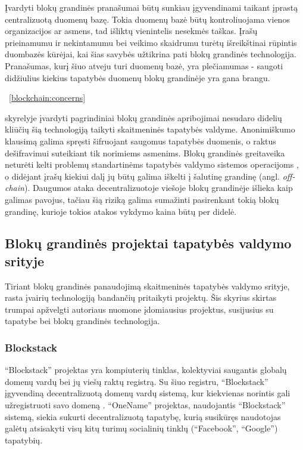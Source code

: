 Įvardyti blokų grandinės pranašumai būtų sunkiau įgyvendinami taikant įprastą centralizuotą duomenų bazę. Tokia duomenų bazė
būtų kontroliuojama vienos organizacijos ar asmens, tad išliktų vienintelis nesekmės taškas. Įrašų prieinamumu ir nekintamumu bei veikimo
skaidrumu
turėtų išreikštinai rūpintis duombazės kūrėjai, kai šias savybės užtikrina pati blokų grandinės technologija. Pranašumas, kurį
šiuo atveju turi duomenų bazė, yra plečiamumas - saugoti didžiulius kiekius tapatybės duomenų blokų grandinėje yra gana brangu.

\hypertarget{blockchain:concerns}{~\ref{blockchain:concerns}} skyrelyje įvardyti pagrindiniai blokų grandinės apribojimai nesudaro didelių kliūčių šią technologiją taikyti skaitmeninės tapatybės valdyme.
Anonimiškumo klausimą galima spręsti šifruojant saugomus tapatybės duomenis,
o raktus dešifravimui suteikiant tik norimiems asmenims. Blokų grandinės greitaveika neturėti kelti problemų
standartinėms tapatybės valdymo sistemos operacijoms \cite{Lo2017}, o didėjant įrašų kiekiui dalį jų būtų galima iškelti į
šalutinę grandinę (angl. \textit{off-chain}). Daugumos ataka decentralizuotoje viešoje blokų grandinėje išlieka kaip galimas pavojus,
tačiau šią riziką galima sumažinti pasirenkant tokią blokų grandinę, kurioje tokios atakos vykdymo kaina būtų per didelė.

\subsection{Blokų grandinės projektai tapatybės valdymo srityje}

Tiriant blokų grandinės panaudojimą skaitmeninės tapatybės valdymo srityje, rasta įvairių
technologiją bandančių pritaikyti projektų. Šis skyrius skirtas trumpai apžvelgti autoriaus nuomone
įdomiausius projektus, susijusius su tapatybe bei blokų grandinės technologija.

\subsubsection{Blockstack}

\enquote{Blockstack} projektas yra kompiuterių tinklas, kolektyviai saugantis globalų
domenų vardų bei jų viešų raktų registrą. Su šiuo registru, \enquote{Blockstack} įgyvendiną
decentralizuotą domenų vardų sistemą, kur kiekvienas norintis gali užregistruoti savo domeną \cite{BlockstackWhitepaper}.
\enquote{OneName} projektas, naudojantis \enquote{Blockstack} sistemą, siekia sukurti decentralizuotą tapatybę,
kurią susikūręs naudotojas galėtų atsisakyti visų kitų turimų socialinių tinklų (\enquote{Facebook},
\enquote{Google}) tapatybių.

